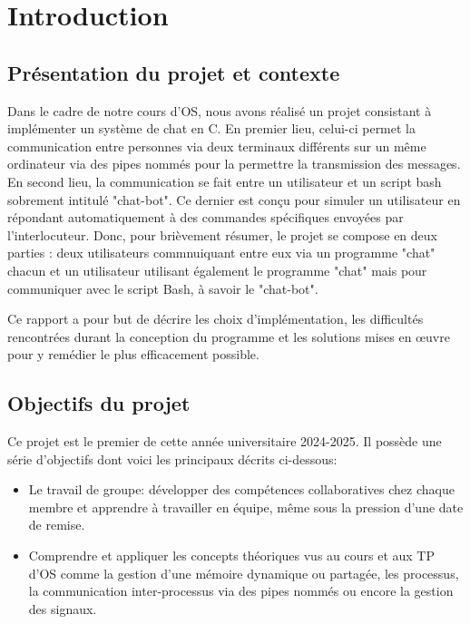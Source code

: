 \documentclass[utf8]{article}
\begin{document}
\newpage
\tableofcontents

\newpage


\section{Introduction}
\subsection{Présentation du projet et contexte}
Dans le cadre de notre cours d'OS, nous avons réalisé un projet consistant à implémenter un système de chat en C.
En premier lieu, celui-ci permet la communication entre personnes via deux terminaux différents sur un même ordinateur via des pipes nommés pour la 
permettre la transmission des messages. En second lieu, la communication se fait entre un utilisateur et un script bash sobrement intitulé "chat-bot". 
Ce dernier est conçu pour simuler un utilisateur en répondant automatiquement à des commandes spécifiques envoyées par l’interlocuteur.
Donc, pour brièvement résumer, le projet se compose en deux parties : deux utilisateurs commnuiquant entre eux via un programme "chat" chacun et un utilisateur utilisant
également le programme "chat" mais pour communiquer avec le script Bash, à savoir le "chat-bot".

Ce rapport a pour but de décrire les choix d'implémentation, les difficultés rencontrées durant la conception du programme et les solutions mises en œuvre pour y remédier
le plus efficacement possible.

\subsection{Objectifs du projet}
Ce projet est le premier de cette année universitaire 2024-2025. Il possède une série d'objectifs dont voici les principaux décrits ci-dessous:
\begin{itemize}
    \item Le travail de groupe: développer des compétences collaboratives chez chaque membre et apprendre à travailler en
          équipe, même sous la pression d'une date de remise.
    \item Comprendre et appliquer les concepts théoriques vus au cours et aux TP d'OS comme la gestion d'une mémoire dynamique
          ou partagée, les processus, la communication inter-processus via des pipes nommés ou encore la gestion des signaux.
\end{itemize}
\end{document}
